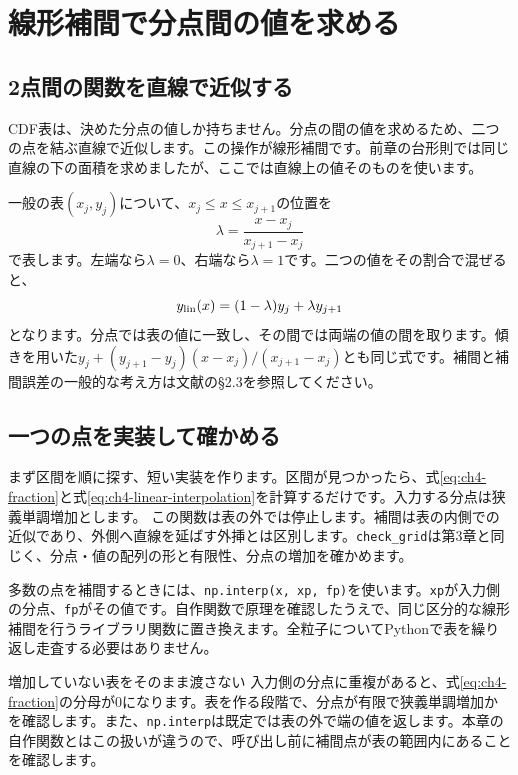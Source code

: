 \section{線形補間で分点間の値を求める}
\label{sec:ch4-interpolation}
\subsection{2点間の関数を直線で近似する}
CDF表は、決めた分点の値しか持ちません。分点の間の値を求めるため、二つの点を結ぶ直線で近似します。この操作が線形補間です。前章の台形則では同じ直線の下の面積を求めましたが、ここでは直線上の値そのものを使います。

一般の表$(x_j,y_j)$について、$x_j\le x\le x_{j+1}$の位置を
\begin{equation}
\lambda=\frac{x-x_j}{x_{j+1}-x_j}
\label{eq:ch4-fraction}
\end{equation}
で表します。左端なら$\lambda=0$、右端なら$\lambda=1$です。二つの値をその割合で混ぜると、
\begin{equation}
y_{\rm lin}(x)=(1-\lambda)y_j+\lambda y_{j+1}
\label{eq:ch4-linear-interpolation}
\end{equation}
となります。分点では表の値に一致し、その間では両端の値の間を取ります。傾きを用いた$y_j+(y_{j+1}-y_j)(x-x_j)/(x_{j+1}-x_j)$とも同じ式です。補間と補間誤差の一般的な考え方は文献\cite{sugiura2009}の\S2.3を参照してください。

\subsection{一つの点を実装して確かめる}
まず区間を順に探す、短い実装を作ります。区間が見つかったら、式\eqref{eq:ch4-fraction}と式\eqref{eq:ch4-linear-interpolation}を計算するだけです。入力する分点は狭義単調増加とします。
この関数は表の外では停止します。補間は表の内側での近似であり、外側へ直線を延ばす外挿とは区別します。\texttt{check\_grid}は第3章と同じく、分点・値の配列の形と有限性、分点の増加を確かめます。

多数の点を補間するときには、\texttt{np.interp(x, xp, fp)}を使います。\texttt{xp}が入力側の分点、\texttt{fp}がその値です。自作関数で原理を確認したうえで、同じ区分的な線形補間を行うライブラリ関数に置き換えます。\cite{numpy}全粒子についてPythonで表を繰り返し走査する必要はありません。

\begin{failbox}{増加していない表をそのまま渡さない}
入力側の分点に重複があると、式\eqref{eq:ch4-fraction}の分母が0になります。表を作る段階で、分点が有限で狭義単調増加かを確認します。また、\texttt{np.interp}は既定では表の外で端の値を返します。本章の自作関数とはこの扱いが違うので、呼び出し前に補間点が表の範囲内にあることを確認します。
\end{failbox}

